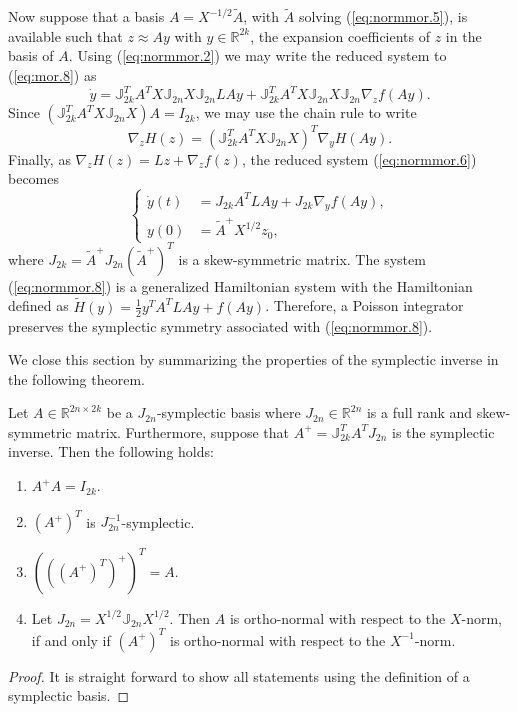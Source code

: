 Now suppose that a basis $A=X^{-1/2}\tilde A$, with $\tilde A$ solving (\ref{eq:normmor.5}), is available such that $z \approx Ay$ with $y\in \mathbb R^{2k}$, the expansion coefficients of $z$ in the basis of $A$. Using (\ref{eq:normmor.2}) we may write the reduced system to (\ref{eq:mor.8}) as
\begin{equation} \label{eq:normmor.6}
	\dot y = \mathbb J_{2k}^T A^T X \mathbb J_{2n} X \mathbb{J}_{2n} LAy + \mathbb J_{2k}^T A^T X \mathbb J_{2n} X \mathbb{J}_{2n} \nabla_z f(Ay).
\end{equation}
Since $(\mathbb J_{2k}^T A^T X \mathbb J_{2n} X) A = I_{2k}$, we may use the chain rule to write
\begin{equation} \label{eq:normmor.7}
	\nabla_z H(z) = ( \mathbb J_{2k}^T A^T X \mathbb J_{2n} X )^T \nabla_y H(Ay).
\end{equation}
Finally, as $\nabla_z H(z) = Lz + \nabla_z f(z)$, the reduced system (\ref{eq:normmor.6}) becomes
\begin{equation} \label{eq:normmor.8}
\left\{
\begin{aligned}
	\dot y(t) &= J_{2k} A^T L A y + J_{2k} \nabla_y f(Ay), \\
	y(0) &= \tilde A^+ X^{1/2} z_0,
\end{aligned}
\right.
\end{equation}
where $J_{2k}=\tilde A^+ J_{2n} (\tilde A^+)^T$ is a skew-symmetric matrix. The system (\ref{eq:normmor.8}) is a generalized Hamiltonian system with the Hamiltonian defined as $\tilde H(y) = \frac 1 2 y^TA^TLAy + f(Ay)$. Therefore, a Poisson integrator preserves the symplectic symmetry associated with (\ref{eq:normmor.8}). 


We close this section by summarizing the properties of the symplectic inverse in the following theorem.
\begin{theorem} \label{thm:2}
Let $A\in \mathbb R^{2n\times 2k}$ be a $J_{2n}$-symplectic basis where $J_{2n}\in\mathbb R^{2n}$ is a full rank and skew-symmetric matrix. Furthermore, suppose that $A^{+} = \mathbb{J}_{2k}^T A^T J_{2n}$ is the symplectic inverse. Then the following holds:
\begin{enumerate}
\item $A^+A = I_{2k}$.
\item $(A^+)^T$ is $J_{2n}^{-1}$-symplectic.
\item $\left(\left(\left(A^+\right)^T\right)^+\right)^T = A$.
\item Let $J_{2n}=X^{1/2}\mathbb J_{2n} X^{1/2}$. Then $A$ is ortho-normal with respect to the $X$-norm, if and only if $(A^+)^T$ is ortho-normal with respect to the $X^{-1}$-norm.
\end{enumerate}
\end{theorem}
\begin{proof}
It is straight forward to show all statements using the definition of a symplectic basis.
\end{proof}

